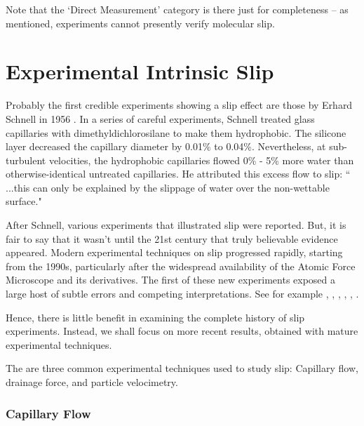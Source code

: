 \documentclass[12pt, a4paper, twoside, openright]{book}
\begin{document}
Note that the `Direct Measurement' category is there just for completeness -- as mentioned,  experiments cannot presently verify molecular slip.

\clearpage
\section{Experimental Intrinsic Slip}

Probably the first credible experiments showing a slip effect are those by Erhard Schnell in 1956 \cite{Schnell1956}. In a series of careful experiments, Schnell treated glass capillaries with dimethyldichlorosilane to make them hydrophobic. The silicone layer decreased the capillary diameter by 0.01\% to 0.04\%. Nevertheless, at sub-turbulent velocities, the hydrophobic capillaries flowed 0\% - 5\% more water than otherwise-identical untreated capillaries. He attributed this excess flow to slip: `` ...this can only be explained by the slippage of water over the non-wettable surface."  

After Schnell, various experiments that illustrated slip were reported. But, it is fair to say that it wasn't until the 21st century that truly believable evidence appeared.
Modern experimental techniques on slip progressed rapidly, starting from the 1990s, particularly after the widespread availability of the Atomic Force Microscope and its derivatives. 
The first of these new experiments exposed a large host of subtle errors and competing interpretations. 
See for example \cite{Pit2000}, \cite{CraigNetoWilliams2001}, \cite{BaudryCharlaix2001}, \cite{ZhuGranick2001}, \cite{Bonaccurso2002}, \cite{Neto2003}.

Hence, there is little benefit in examining the complete history of slip experiments.  Instead, we shall focus on more recent results, obtained with mature experimental techniques.


The are three common experimental techniques used to study slip: Capillary flow, drainage force, and particle velocimetry.

\subsubsection{Capillary Flow}
\end{document}
